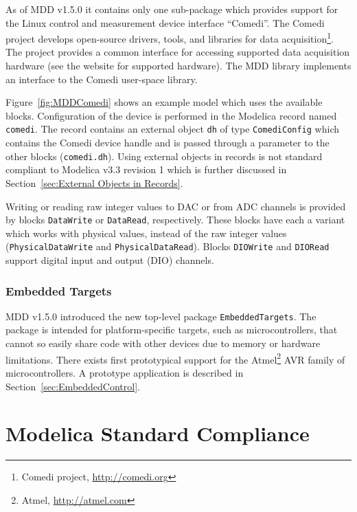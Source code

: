 \documentclass{resources/modelica}
\newcommand{\modelica}[1]{\lstinline[language=modelica]|#1|}
\newcommand{\BTHI}[1]{}
\begin{document}
\noindent
As of MDD v1.5.0 it contains only one sub-package which
provides support for the Linux control and measurement device interface
``Comedi''. The Comedi project develops open-source drivers, tools, and
libraries for data acquisition\footnote{Comedi project,
\url{http://comedi.org}}. The project provides a common interface for
accessing supported data acquisition hardware (see the website for supported
hardware). The MDD library implements an interface to the Comedi user-space
library.

Figure~\ref{fig:MDDComedi} shows an example model which uses the available
blocks. Configuration of the device is performed in the Modelica record named
\modelica{comedi}. The record contains an external object \modelica{dh} of type
\modelica{ComediConfig} which contains the Comedi device handle and is passed through
a parameter to the other blocks (\modelica{comedi.dh}). Using external
objects in records is not standard compliant to Modelica v3.3 revision 1
\citep{ModelicaAssociation2014} which is further discussed in
Section~\ref{sec:External Objects in Records}.

Writing or reading raw integer values to DAC or from ADC channels is provided by
blocks \modelica{DataWrite} or \modelica{DataRead}, respectively. These blocks have
each a variant which works with physical values, instead of the raw integer
values  (\modelica{PhysicalDataWrite} and \modelica{PhysicalDataRead}).
Blocks \modelica{DIOWrite} and \modelica{DIORead} support digital input and
output (DIO) channels.

\subsubsection{Embedded Targets}
\label{sec:EmbeddedTargets}

MDD v1.5.0 introduced the new top-level package \modelica{EmbeddedTargets}. The
package is intended for platform-specific targets, such as microcontrollers,
that cannot so easily share code with other devices due to memory or hardware
limitations.
There exists first prototypical support for the
Atmel\footnote{Atmel, \url{http://atmel.com}} AVR family of
microcontrollers. A prototype application is described in
Section~\ref{sec:EmbeddedControl}.

\section{Modelica Standard Compliance}
\label{sec:ModelicaStandardCompliance}
\BTHI{TODO: Thomas, Bernhard}
\end{document}
